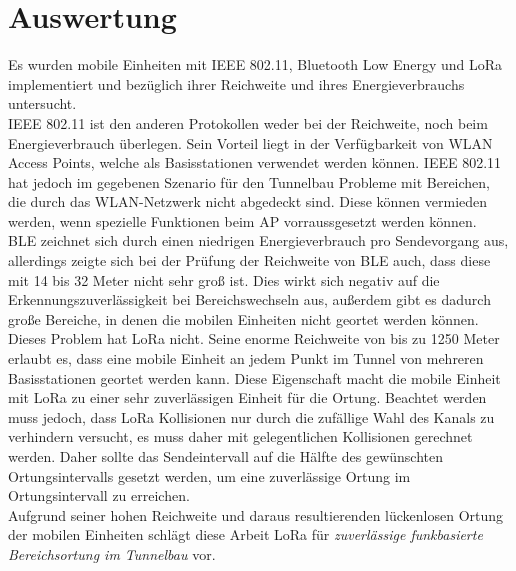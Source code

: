 \section{Auswertung}
Es wurden mobile Einheiten mit IEEE 802.11, Bluetooth Low Energy und LoRa implementiert und bezüglich ihrer Reichweite und ihres Energieverbrauchs untersucht.\\
IEEE 802.11 ist den anderen Protokollen weder bei der Reichweite, noch beim Energieverbrauch überlegen. 
Sein Vorteil liegt in der Verfügbarkeit von WLAN Access Points, welche als Basisstationen verwendet werden können.
IEEE 802.11 hat jedoch im gegebenen Szenario für den Tunnelbau Probleme mit Bereichen, die durch das WLAN-Netzwerk nicht abgedeckt sind. 
Diese können vermieden werden, wenn spezielle Funktionen beim AP vorraussgesetzt werden können.\\
BLE zeichnet sich durch einen niedrigen Energieverbrauch pro Sendevorgang aus, allerdings zeigte sich bei der Prüfung der Reichweite von BLE auch, dass diese mit 14 bis 32 Meter nicht sehr groß ist.
Dies wirkt sich negativ auf die Erkennungszuverlässigkeit bei Bereichswechseln aus, außerdem gibt es dadurch große Bereiche, in denen die mobilen Einheiten nicht geortet werden können.\\
Dieses Problem hat LoRa nicht. 
Seine enorme Reichweite von bis zu 1250 Meter erlaubt es, dass eine mobile Einheit an jedem Punkt im Tunnel von mehreren Basisstationen geortet werden kann.
Diese Eigenschaft macht die mobile Einheit mit LoRa zu einer sehr zuverlässigen Einheit für die Ortung.
Beachtet werden muss jedoch, dass LoRa Kollisionen nur durch die zufällige Wahl des Kanals zu verhindern versucht, es muss daher mit gelegentlichen Kollisionen gerechnet werden.
Daher sollte das Sendeintervall auf die Hälfte des gewünschten Ortungsintervalls gesetzt werden, um eine zuverlässige Ortung im Ortungsintervall zu erreichen.\\
Aufgrund seiner hohen Reichweite und daraus resultierenden lückenlosen Ortung der mobilen Einheiten schlägt diese Arbeit LoRa für \emph{zuverlässige funkbasierte Bereichsortung im Tunnelbau} vor.





